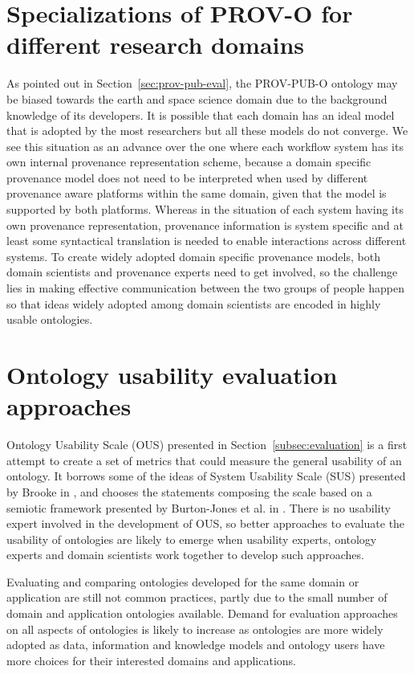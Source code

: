 \section{Specializations of PROV-O for different research domains}
As pointed out in Section~\ref{sec:prov-pub-eval}, the PROV-PUB-O ontology may be biased towards the earth and space science domain due to the background knowledge of its developers. It is possible that each domain has an ideal model that is adopted by the most researchers but all these models do not converge. We see this situation as an advance over the one where each workflow system has its own internal provenance representation scheme, because a domain specific provenance model does not need to be interpreted when used by different provenance aware platforms within the same domain, given that the model is supported by both platforms. Whereas in the situation of each system having its own provenance representation, provenance information is system specific and at least some syntactical translation is needed to enable interactions across different systems. To create widely adopted domain specific provenance models, both domain scientists and provenance experts need to get involved, so the challenge lies in making effective communication between the two groups of people happen so that ideas widely adopted among domain scientists are encoded in highly usable ontologies.

\section{Ontology usability evaluation approaches}
Ontology Usability Scale (OUS) presented in Section~\ref{subsec:evaluation} is a first attempt to create a set of metrics that could measure the general usability of an ontology. It borrows some of the ideas of System Usability Scale (SUS) presented by Brooke in \cite{brooke1996sus}, and chooses the statements composing the scale based on a semiotic framework presented by Burton-Jones et al. in \cite{burton2005semiotic}. There is no usability expert involved in the development of OUS, so better approaches to evaluate the usability of ontologies are likely to emerge when usability experts, ontology experts and domain scientists work together to develop such approaches.

Evaluating and comparing ontologies developed for the same domain or application are still not common practices, partly due to the small number of domain and application ontologies available. Demand for evaluation approaches on all aspects of ontologies is likely to increase as ontologies are more widely adopted as data, information and knowledge models and ontology users have more choices for their interested domains and applications.

